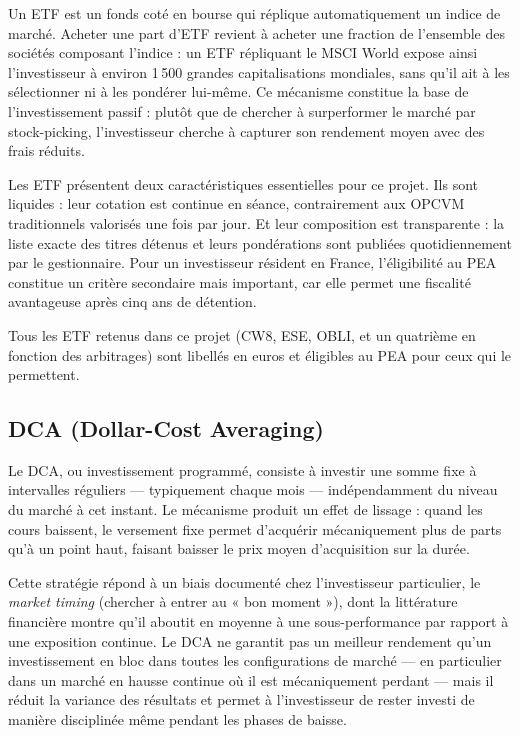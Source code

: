 \documentclass[11pt,a4paper]{article}
\begin{document}
Un ETF est un fonds coté en bourse qui réplique automatiquement un
indice de marché. Acheter une part d'ETF revient à acheter une fraction
de l'ensemble des sociétés composant l'indice : un ETF répliquant le
MSCI World expose ainsi l'investisseur à environ 1\,500 grandes
capitalisations mondiales, sans qu'il ait à les sélectionner ni à les
pondérer lui-même. Ce mécanisme constitue la base de l'investissement
passif : plutôt que de chercher à surperformer le marché par
stock-picking, l'investisseur cherche à capturer son rendement moyen
avec des frais réduits.

Les ETF présentent deux caractéristiques essentielles pour ce projet.
Ils sont liquides : leur cotation est continue en séance, contrairement
aux OPCVM traditionnels valorisés une fois par jour. Et leur composition
est transparente : la liste exacte des titres détenus et leurs
pondérations sont publiées quotidiennement par le gestionnaire. Pour un
investisseur résident en France, l'éligibilité au PEA constitue un
critère secondaire mais important, car elle permet une fiscalité
avantageuse après cinq ans de détention.

Tous les ETF retenus dans ce projet (CW8, ESE, OBLI, et un quatrième en
fonction des arbitrages) sont libellés en euros et éligibles au PEA pour
ceux qui le permettent.

\subsection{DCA (Dollar-Cost Averaging)}

Le DCA, ou investissement programmé, consiste à investir une somme fixe
à intervalles réguliers — typiquement chaque mois — indépendamment du
niveau du marché à cet instant. Le mécanisme produit un effet de
lissage : quand les cours baissent, le versement fixe permet d'acquérir
mécaniquement plus de parts qu'à un point haut, faisant baisser le prix
moyen d'acquisition sur la durée.

Cette stratégie répond à un biais documenté chez l'investisseur
particulier, le \textit{market timing} (chercher à entrer au « bon
moment »), dont la littérature financière montre qu'il aboutit en
moyenne à une sous-performance par rapport à une exposition continue.
Le DCA ne garantit pas un meilleur rendement qu'un investissement en
bloc dans toutes les configurations de marché — en particulier dans un
marché en hausse continue où il est mécaniquement perdant — mais il
réduit la variance des résultats et permet à l'investisseur de rester
investi de manière disciplinée même pendant les phases de baisse.
\end{document}
